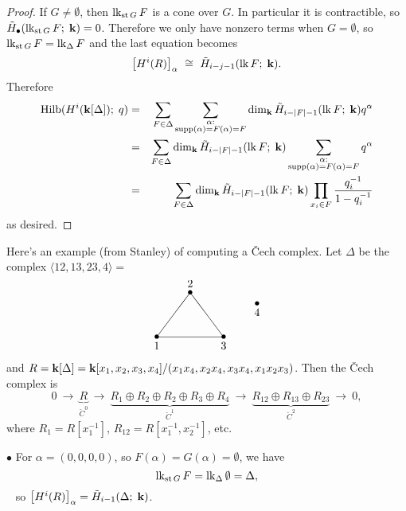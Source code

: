\documentclass{amsart}
\renewcommand{\star}{\mathop{\rm st}\nolimits}
\newcommand{\link}{\mathop{\rm 
lk}\nolimits}
\newcommand{\0}{\emptyset}
\newcommand{\CE}{\check{C}}
\newcommand{\Hilb}{\mathop{\rm Hilb}\nolimits}
\newcommand{\supp}{\mathop{\rm supp}\nolimits}
\newcommand{\fld}{{\bf k}}
\newcommand{\isom}{\cong}
\newcommand{\puttext}[2] {\put(#1){\makebox(0,0){#2}}}
\newcommand{\putdot}[1]  {\put(#1){\makebox(0,0){$\bullet$}}}
\newcommand{\putline}[3] {\put(#1){\line(#2){#3}}}
\begin{document}
\begin{proof}
If $G \neq \emptyset$, then $\link_{\star G} F$ is a cone over $G$.  In particular it is 
contractible, so $\tilde H_\bullet(\link_{\star G} F;\; \fld)=0$.  Therefore we only have 
nonzero terms when $G = \emptyset$, so $\link_{\star G} F = \link_\Delta F$ and the last 
equation becomes
	\begin{equation}
	\left[H^i(R)\right]_\alpha ~\isom~ \tilde H_{i-j-1}(\link F;\; \fld).
	\end{equation}
Therefore
	\begin{eqnarray}
	\Hilb(H^i(\fld[\Delta]);\;q) &=& \sum_{F \in \Delta} 
	\sum_{\substack{\alpha: \\ \supp(\alpha)=F(\alpha)=F}}
	\dim_\fld \tilde H_{i-|F|-1}(\link F;\;\fld) q^\alpha \\
	&=& \sum_{F \in \Delta} \dim_\fld \tilde H_{i-|F|-1}(\link F;\;\fld)
	\sum_{\substack{\alpha: \\ \supp(\alpha)=F(\alpha)=F}} q^\alpha \\
	&=& \sum_{F \in \Delta} \dim_\fld \tilde H_{i-|F|-1}(\link F;\;\fld)
	\prod_{x_i \in F} \frac{q_i^{-1}}{1-q_i^{-1}}
	\end{eqnarray}
as desired.
\end{proof}

Here's an example (from Stanley) of computing a \v{C}ech complex.  Let $\Delta$ be the complex
$\langle 12,13,23,4 \rangle =$
        \begin{equation} \label{delta-ex}
        \begin{picture}(110,60)
        \putdot{10,10}  \puttext{10, 2}{$1$}
        \putdot{40,50}  \puttext{40,58}{$2$}
        \putdot{70,10}  \puttext{70, 2}{$3$}
        \putdot{100,40}  \puttext{100,32}{$4$}
        \putline{10,10}{3,4}{30}        %
        \putline{10,10}{1,0}{60}        %
        \putline{70,10}{-3,4}{30}       %
        \end{picture}
        \end{equation}

and $R = \fld[\Delta] = \fld[x_1,x_2,x_3,x_4]/(x_1x_4,x_2x_4,x_3x_4,x_1x_2x_3)$.  Then the 
\v{C}ech complex is
	$$0 ~\to~ \underbrace{R}_{\CE^0} ~\to~
	\underbrace{R_1 \oplus R_2 \oplus R_2 \oplus R_3 \oplus R_4}_{\CE^1} ~\to~
	\underbrace{R_{12} \oplus R_{13} \oplus R_{23}}_{\CE^2} ~\to~ 0,$$
where $R_1 = R[x_1^{-1}]$, $R_{12} = R[x_1^{-1},x_2^{-1}]$, etc.

$\bullet$ \quad For $\alpha=(0,0,0,0)$, so $F(\alpha)=G(\alpha)=\emptyset$, we have
	$$\link_{\star G} F = \link_\Delta \emptyset = \Delta,$$
\quad~ so $\left[ H^i(R) \right]_\alpha = \tilde H_{i-1}(\Delta;\;\fld)$.
\end{document}
